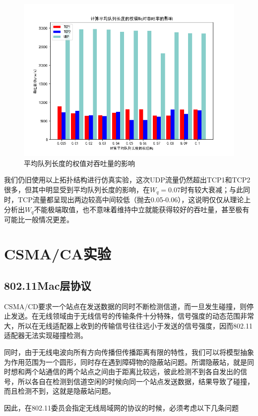\documentclass{article}
\begin{document}
\begin{figure}[H]
	\centering
	\includegraphics[scale=0.6]{picture/Wq.png}
	\caption{平均队列长度的权值对吞吐量的影响}
	\label{fig:Wq}
\end{figure}

我们仍旧使用以上拓扑结构进行仿真实验，这次UDP流量仍然超出TCP1和TCP2很多，但其中明显受到平均队列长度的影响，在$W_q=0.07$时有较大衰减；与此同时，TCP流量都呈现出两边较高中间较低（抛去0.05-0.06），这说明仅仅从理论上分析出$W_q$不能极端取值，也不意味着维持中立就能获得较好的吞吐量，甚至极有可能比一般情况更差。
\section{CSMA/CA实验}
\subsection{802.11Mac层协议}

CSMA/CD要求一个站点在发送数据的同时不断检测信道，而一旦发生碰撞，则停止发送。在无线领域由于无线信号的传输条件十分特殊，信号强度的动态范围非常大，所以在无线适配器上收到的传输信号往往远小于发送的信号强度，因而802.11适配器无法实现碰撞检测。

同时，由于无线电波向所有方向传播但传播距离有限的特性，我们可以将模型抽象为作用范围为一个圆形，同时存在遇到障碍物的隐蔽站问题。所谓隐蔽站，就是同时想和两个站通信的两个站点之间由于距离比较远，彼此检测不到各自发出的信号，所以各自在检测到信道空闲的时候向同一个站点发送数据，结果导致了碰撞，而且检测不到，这就是隐蔽站问题。

因此，在802.11委员会指定无线局域网的协议的时候，必须考虑以下几条问题
\end{document}
